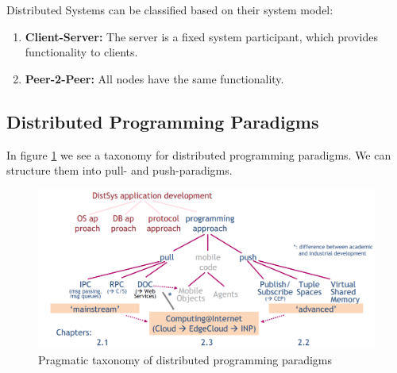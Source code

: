Distributed Systems can be classified based on their system model:

\begin{enumerate}
    \item \textbf{Client-Server:} The server is a fixed system participant, which provides functionality to clients.
    \item \textbf{Peer-2-Peer:} All nodes have the same functionality.
\end{enumerate}

\subsection{Distributed Programming Paradigms}

In figure \ref{fig:programming_paradigms} we see a taxonomy for distributed programming paradigms. We can structure them into pull- and push-paradigms.

\begin{figure}[h]
    \centering
    \includegraphics[width=\textwidth]{gfx/programming_paradigms.png}
    \caption{Pragmatic taxonomy of distributed programming paradigms}
    \label{fig:programming_paradigms}
\end{figure}
